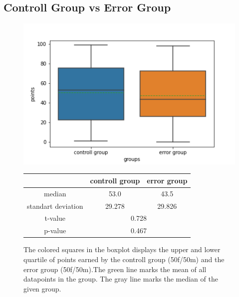 \documentclass[runningheads]{llncs}
\begin{document}
\subsection{Controll Group vs Error Group}
\begin{figure}
    \begin{minipage}{0.45\textwidth}        
        \includegraphics[width=\textwidth]{code/generate/all.png}
        \caption{The colored squares in the boxplot displays
        the upper and lower quartile of points earned by the controll group (50f/50m) and
        the error group (50f/50m).The green line marks the mean of all datapoints in the group.
        The gray line marks the median  of the given group.} \label{fig2}
    \end{minipage}
\hfill
\begin{minipage}{0.45\textwidth}
\begin{tabular}[]{| c | c | c |}
        \hline
        & controll group & error group \\
        \hline
        median & 53.0&43.5 \\
        \hline
        standart deviation & 29.278&29.826 \\
        \hline
        t-value & \multicolumn{2}{c|}{0.728} \\
        \hline
        p-value & \multicolumn{2}{c|}{0.467} \\
        \hline            
\end{tabular}
\end{minipage}
\end{figure}
\end{document}

